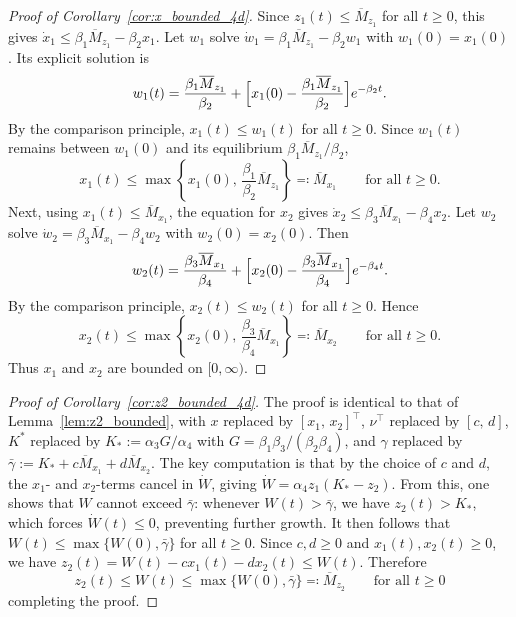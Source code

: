 \documentclass{article}
\begin{document}
\begin{proof}[Proof of Corollary~\ref{cor:x_bounded_4d}]
    Since $z_1(t)\le \overline{M}_{z_1}$ for all $t\ge 0$, this
    gives $\dot x_1\le\beta_1\overline{M}_{z_1}-\beta_2 x_1$. Let $w_1$ solve 
    $\dot w_1=\beta_1\overline{M}_{z_1}-\beta_2 w_1$ with $w_1(0)=x_1(0)$. Its explicit 
    solution is
    \begin{equation*}
        w_1(t)=\frac{\beta_1\overline{M}_{z_1}}{\beta_2}
        +\Bigl[x_1(0)-\frac{\beta_1\overline{M}_{z_1}}{\beta_2}\Bigr]e^{-\beta_2 t}.
    \end{equation*}
    By the comparison principle, $x_1(t)\le w_1(t)$ for all $t\ge 0$. Since 
    $w_1(t)$ remains between $w_1(0)$ and its equilibrium $\beta_1\overline{M}_{z_1}/\beta_2$,
    \begin{equation}\label{eq:x1_bound}
        x_1(t)\le \max\left\{x_1(0),\,\frac{\beta_1}{\beta_2}\overline{M}_{z_1}\right\}
        \eqqcolon \overline{M}_{x_1} \qquad\text{for all } t\ge 0.
    \end{equation}
    Next, using $x_1(t)\le \overline{M}_{x_1}$, the equation for $x_2$ gives 
    $\dot x_2\le\beta_3\overline{M}_{x_1}-\beta_4 x_2$. Let $w_2$ solve 
    $\dot w_2=\beta_3\overline{M}_{x_1}-\beta_4 w_2$ with $w_2(0)=x_2(0)$. Then
    \begin{equation*}
        w_2(t)=\frac{\beta_3\overline{M}_{x_1}}{\beta_4}
        +\Bigl[x_2(0)-\frac{\beta_3\overline{M}_{x_1}}{\beta_4}\Bigr]e^{-\beta_4 t}.
    \end{equation*}
    By the comparison principle, $x_2(t)\le w_2(t)$ for all $t\ge 0$. Hence
    \begin{equation}\label{eq:x2_bound}
        x_2(t)\le \max\left\{x_2(0),\,\frac{\beta_3}{\beta_4}\overline{M}_{x_1}\right\}
        \eqqcolon \overline{M}_{x_2} \qquad\text{for all } t\ge 0.
    \end{equation}
    Thus $x_1$ and $x_2$ are bounded on $[0,\infty)$.
\end{proof}

\begin{proof}[Proof of Corollary~\ref{cor:z2_bounded_4d}]
    The proof is identical to that of Lemma~\ref{lem:z2_bounded}, with $x$ 
    replaced by $[x_1,\,x_2]^\top$, $\nu^\top$ replaced by $[c,\,d]$, $K^*$ 
    replaced by $K_*:=\alpha_3 G/\alpha_4$ with $G=\beta_1\beta_3/(\beta_2\beta_4)$, 
    and $\gamma$ replaced by $\bar\gamma:=K_*+c\overline{M}_{x_1}+d\overline{M}_{x_2}$. 
    The key computation is that by the choice of $c$ and $d$, the $x_1$- and 
    $x_2$-terms cancel in $\dot W$, giving $\dot W=\alpha_4 z_1(K_*-z_2)$. From this, 
    one shows that $W$ cannot exceed $\bar\gamma$: whenever $W(t)>\bar\gamma$, 
    we have $z_2(t)>K_*$, which forces $\dot W(t)\le 0$, preventing further 
    growth. It then follows that $W(t)\le\max\{W(0),\bar\gamma\}$ for all 
    $t\ge 0$.
    Since $c,d\ge0$ and $x_1(t),x_2(t)\ge0$, we have $z_2(t)=W(t)-cx_1(t)-dx_2(t)\le W(t)$. Therefore
    \begin{equation*}
        z_2(t) \le W(t) \le \max\{W(0),\bar\gamma\}\eqqcolon \overline{M}_{z_2} 
        \qquad\text{for all }t\ge 0
    \end{equation*}
    completing the proof.
\end{proof}

\newpage



\end{document}

